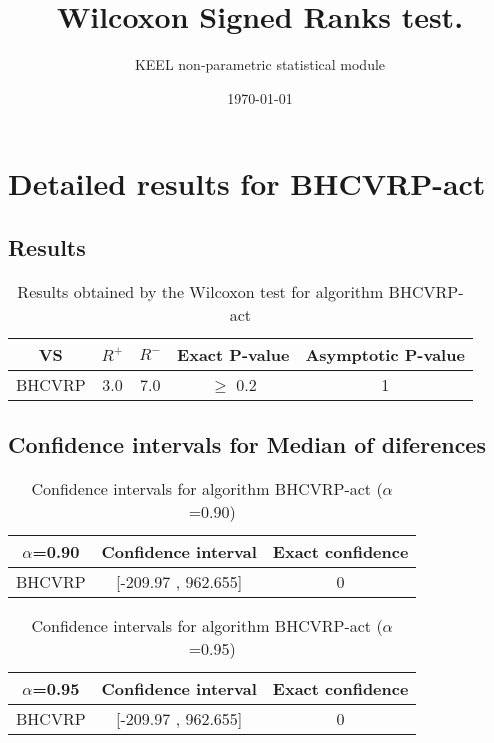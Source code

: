 \documentclass[a4paper,10pt]{article}
\title{Wilcoxon Signed Ranks test.}
\date{\today}
\author{KEEL non-parametric statistical module}
\begin{document}
\pagestyle{empty}
\maketitle
\thispagestyle{empty}



\section{Detailed results for BHCVRP-act}


\subsection{Results}

\begin{table}[!htp]
\centering\small
\begin{tabular}{
|c|c|c|c|c|}
\hline
 VS & $R^{+}$ & $R^{-}$ & Exact P-value & Asymptotic P-value \\ \hline 
BHCVRP & 3.0 & 7.0 & $\geq$ 0.2 & 1\\ \hline 

\end{tabular}
\caption{Results obtained by the Wilcoxon test for algorithm BHCVRP-act}
\end{table}

\subsection{Confidence intervals for Median of diferences}

\begin{table}[!htp]
\centering\small
\begin{tabular}{
|c|c|c|}
\hline
 $\alpha$=0.90 & Confidence interval & Exact confidence \\ \hline 
BHCVRP & [-209.97 , 962.655] & 0\\ \hline 

\end{tabular}
\caption{Confidence intervals for algorithm BHCVRP-act ($\alpha$=0.90)}
\end{table}
\begin{table}[!htp]
\centering\small
\begin{tabular}{
|c|c|c|}
\hline
 $\alpha$=0.95 & Confidence interval & Exact confidence \\ \hline 
BHCVRP & [-209.97 , 962.655] & 0\\ \hline 

\end{tabular}
\caption{Confidence intervals for algorithm BHCVRP-act ($\alpha$=0.95)}
\end{table}
\end{document}
